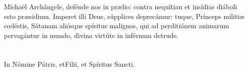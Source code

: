 \documentclass[9pt]{article}
\begin{document}
\begin{multicols*}{2}
     Michaël Archángele, defénde nos in pr{\ae}lio: contra nequítian et insídias diáboli esto pr{\ae}sidium. Imperet illi Deus, 
    súpplices deprecámur: tuque, Prínceps militi{\ae} c{\oe}léstis, Sátanam aliósque spíritus malignos, qui ad perditiónem animarum pervagántur in mundo,
    divina virtúte in inférnum detrude. \\

    \\
    
    \\

    In Nómine Pátris, et{\redcross}Filii, et Spíritus Sancti.

\end{multicols*}
\end{document}
